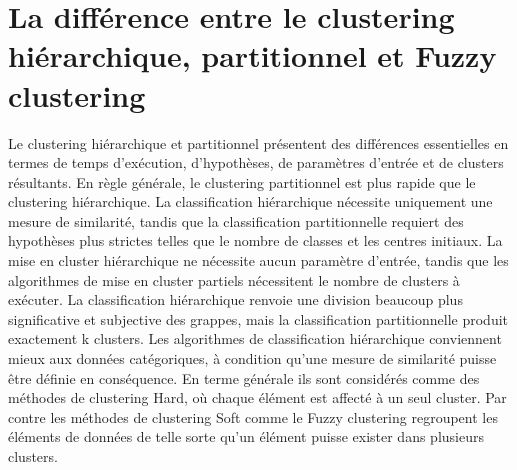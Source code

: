\section{La différence entre le clustering hiérarchique, partitionnel et Fuzzy clustering}
Le clustering hiérarchique et partitionnel présentent des différences essentielles en termes de temps d’exécution, d’hypothèses, de paramètres d’entrée et de clusters résultants. En règle générale, le clustering partitionnel est plus rapide que le clustering hiérarchique. La classification hiérarchique nécessite uniquement une mesure de similarité, tandis que la classification partitionnelle requiert des hypothèses plus strictes telles que le nombre de classes et les centres initiaux. La mise en cluster hiérarchique ne nécessite aucun paramètre d’entrée, tandis que les algorithmes de mise en cluster partiels nécessitent le nombre de clusters à exécuter. La classification hiérarchique renvoie une division beaucoup plus significative et subjective des grappes, mais la classification partitionnelle produit exactement k clusters. Les algorithmes de classification hiérarchique conviennent mieux aux données catégoriques, à condition qu’une mesure de similarité puisse être définie en conséquence. En terme générale ils sont considérés comme des méthodes de clustering Hard, où chaque élément est affecté à un seul cluster. Par contre les méthodes de clustering Soft comme le Fuzzy clustering regroupent les éléments de données de telle sorte qu'un élément puisse exister dans plusieurs clusters.
